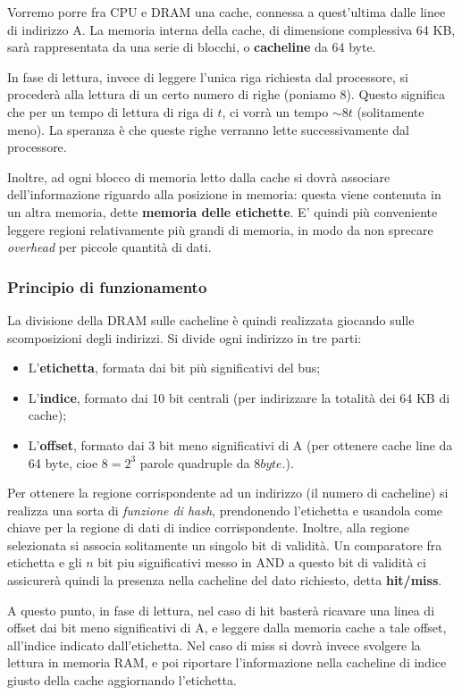 \documentclass[a4paper,11pt]{article}
\begin{document}
Vorremo porre fra CPU e DRAM una cache, connessa a quest'ultima dalle linee di indirizzo A.
La memoria interna della cache, di dimensione complessiva 64 KB, sarà rappresentata da una serie di blocchi, o \textbf{cacheline} da 64 byte.

In fase di lettura, invece di leggere l'unica riga richiesta dal processore, si procederà alla lettura di un certo numero di righe (poniamo 8).
Questo significa che per un tempo di lettura di riga di $t$, ci vorrà un tempo $\sim 8t$ (solitamente meno).
La speranza è che queste righe verranno lette successivamente dal processore.

Inoltre, ad ogni blocco di memoria letto dalla cache si dovrà associare dell'informazione riguardo alla posizione in memoria: questa viene contenuta in un altra memoria, dette \textbf{memoria delle etichette}.
E' quindi più conveniente leggere regioni relativamente più grandi di memoria, in modo da non sprecare \textit{overhead} per piccole quantità di dati.

\subsubsection{Principio di funzionamento}
La divisione della DRAM sulle cacheline è quindi realizzata giocando sulle scomposizioni degli indirizzi.
Si divide ogni indirizzo in tre parti:
\begin{itemize}
	\item L'\textbf{etichetta}, formata dai bit più significativi del bus;
	\item L'\textbf{indice}, formato dai 10 bit centrali (per indirizzare la totalità dei 64 KB di cache);
	\item L'\textbf{offset}, formato dai 3 bit meno significativi di A (per ottenere cache line da 64 byte, cioe $8 = 2^3$ parole quadruple da $8 byte$.). 
\end{itemize}

Per ottenere la regione corrispondente ad un indirizzo (il numero di cacheline) si realizza una sorta di \textit{funzione di hash}, prendonendo l'etichetta e usandola come chiave per la regione di dati di indice corrispondente.
Inoltre, alla regione selezionata si associa solitamente un singolo bit di validità.
Un comparatore fra etichetta e gli $n$ bit piu significativi messo in AND a questo bit di validità ci assicurerà quindi la presenza nella cacheline del dato richiesto, detta \textbf{hit/miss}.

A questo punto, in fase di lettura, nel caso di hit basterà ricavare una linea di offset dai bit meno significativi di A, e leggere dalla memoria cache a tale offset, all'indice indicato dall'etichetta.
Nel caso di miss si dovrà invece svolgere la lettura in memoria RAM, e poi riportare l'informazione nella cacheline di indice giusto della cache aggiornando l'etichetta.
\end{document}
